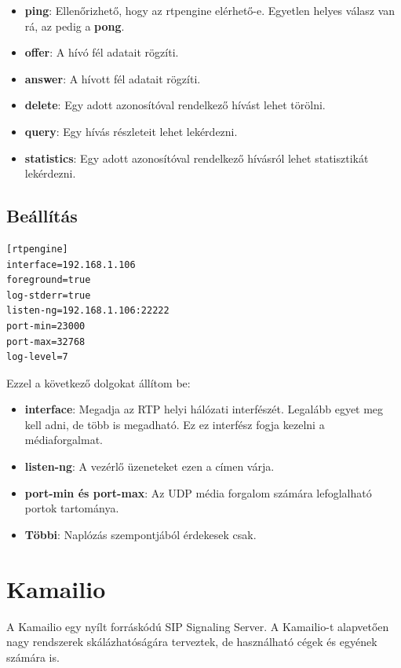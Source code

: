 \begin{itemize}
	\item \textbf{ping}: Ellenőrizhető, hogy az rtpengine elérhető-e. Egyetlen helyes 
	válasz van rá, az pedig a \textbf{pong}.
	\item \textbf{offer}: A hívó fél adatait rögzíti.
	\item \textbf{answer}: A hívott fél adatait rögzíti. 
	\item \textbf{delete}: Egy adott azonosítóval rendelkező hívást lehet törölni.
	\item \textbf{query}: Egy hívás részleteit lehet lekérdezni. 
	\item \textbf{statistics}: Egy adott azonosítóval rendelkező hívásról lehet 
	statisztikát lekérdezni. 
\end{itemize} 

\subsection{Beállítás}

\begin{lstlisting}[caption=rtpengine konfigurációja, label=lst:confRtpe]
[rtpengine]
interface=192.168.1.106
foreground=true
log-stderr=true
listen-ng=192.168.1.106:22222
port-min=23000
port-max=32768
log-level=7
\end{lstlisting}

Ezzel a következő dolgokat állítom be: 

\begin{itemize}
	\item \textbf{interface}: Megadja az RTP helyi hálózati interfészét. Legalább
	egyet meg kell adni, de több is megadható. Ez ez interfész fogja kezelni a 
	médiaforgalmat. 
	\item \textbf{listen-ng}: A vezérlő üzeneteket ezen a címen várja. 
	\item \textbf{port-min és port-max}: Az UDP média forgalom számára lefoglalható
	portok tartománya. 
	\item \textbf{Többi}: Naplózás szempontjából érdekesek csak. 
\end{itemize}

\section{Kamailio}

A Kamailio egy nyílt forráskódú SIP Signaling Server. A Kamailio-t alapvetően nagy 
rendszerek skálázhatóságára terveztek, de használható cégek és egyének számára is.

